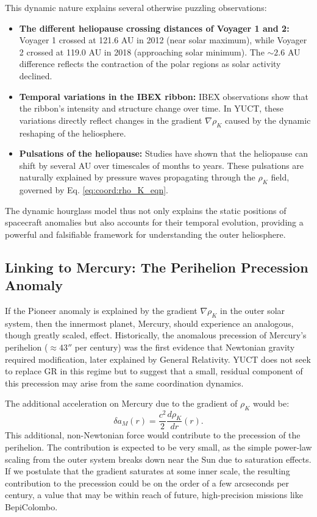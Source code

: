 \documentclass[12pt,a4paper]{article}
\theoremstyle{remark}
\begin{document}
	This dynamic nature explains several otherwise puzzling observations:
	\begin{itemize}
		\item \textbf{The different heliopause crossing distances of Voyager 1 and 2:} Voyager 1 crossed at 121.6 AU in 2012 (near solar maximum), while Voyager 2 crossed at 119.0 AU in 2018 (approaching solar minimum). The \(\sim2.6\) AU difference reflects the contraction of the polar regions as solar activity declined.
		
		\item \textbf{Temporal variations in the IBEX ribbon:} IBEX observations show that the ribbon's intensity and structure change over time. In YUCT, these variations directly reflect changes in the gradient $\nabla \rho_K$ caused by the dynamic reshaping of the heliosphere.
		
		\item \textbf{Pulsations of the heliopause:} Studies have shown that the heliopause can shift by several AU over timescales of months to years. These pulsations are naturally explained by pressure waves propagating through the $\rho_K$ field, governed by Eq. \eqref{eq:coord:rho_K_eqn}.
	\end{itemize}
	
	The dynamic hourglass model thus not only explains the static positions of spacecraft anomalies but also accounts for their temporal evolution, providing a powerful and falsifiable framework for understanding the outer heliosphere.
	
	\subsection{Linking to Mercury: The Perihelion Precession Anomaly}
	\label{subsec:coord:mercury}
	
	If the Pioneer anomaly is explained by the gradient $\nabla \rho_K$ in the outer solar system, then the innermost planet, Mercury, should experience an analogous, though greatly scaled, effect. Historically, the anomalous precession of Mercury's perihelion ($ \approx 43''$ per century) was the first evidence that Newtonian gravity required modification, later explained by General Relativity. YUCT does not seek to replace GR in this regime but to suggest that a small, residual component of this precession may arise from the same coordination dynamics.
	
	The additional acceleration on Mercury due to the gradient of $\rho_K$ would be:
	\begin{equation}
		\delta a_M(r) = \frac{c^2}{2} \frac{d\rho_K}{dr}(r).
	\end{equation}
	This additional, non-Newtonian force would contribute to the precession of the perihelion. The contribution is expected to be very small, as the simple power-law scaling from the outer system breaks down near the Sun due to saturation effects. If we postulate that the gradient saturates at some inner scale, the resulting contribution to the precession could be on the order of a few arcseconds per century, a value that may be within reach of future, high-precision missions like BepiColombo.
	
\end{document}
